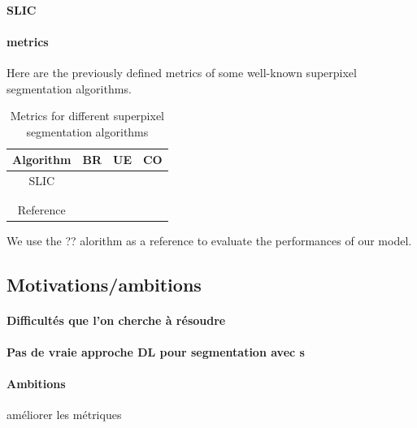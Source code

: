 \documentclass{article}
\begin{document}
            \paragraph{SLIC}
            \paragraph{metrics}
            Here are the previously defined metrics of some well-known superpixel segmentation algorithms.
            \begin{table}[!ht]
                \center
                \begin{tabular}{|c|c|c|c|}
                    \hline
                    Algorithm & BR & UE & CO\\
                    \hline
                    \hline
                    SLIC & & & \\
                    \hline
                     & & & \\
                    \hline
                     & & & \\
                    \hline
                    \hline
                    Reference & & & \\
                    \hline
                \end{tabular}
                \caption{Metrics for different superpixel segmentation algorithms}
            \end{table}

            \noindent We use the ?? alorithm as a reference to evaluate the performances of our model.
    \subsection{Motivations/ambitions}
            \paragraph{Difficultés que l'on cherche à résoudre}
            \paragraph{Pas de vraie approche DL pour segmentation avec \spp s}
            \paragraph{Ambitions}
            améliorer les métriques
\end{document}

